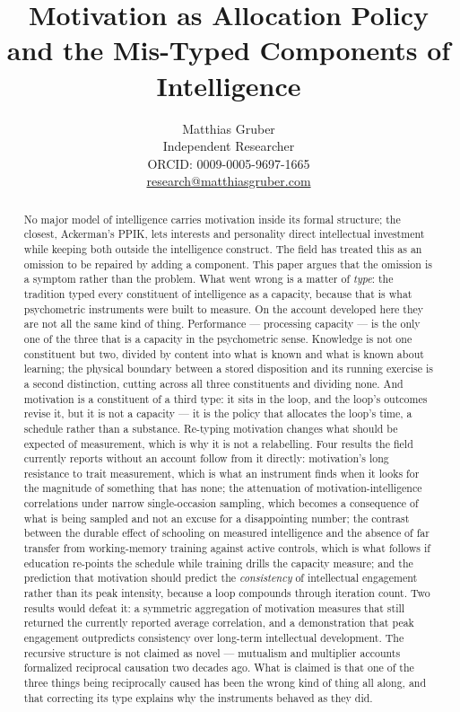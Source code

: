 \documentclass[12pt,a4paper]{article}
\title{Motivation as Allocation Policy and the Mis-Typed Components of Intelligence}
\author{Matthias Gruber\\
\small Independent Researcher\\
\small ORCID: 0009-0005-9697-1665\\
\small \href{mailto:research@matthiasgruber.com}{research@matthiasgruber.com}}
\date{}
\begin{document}
\maketitle

\begin{abstract}

No major model of intelligence carries motivation inside its formal structure; the closest, Ackerman's PPIK, lets interests and personality direct intellectual investment while keeping both outside the intelligence construct. The field has treated this as an omission to be repaired by adding a component. This paper argues that the omission is a symptom rather than the problem. What went wrong is a matter of \emph{type}: the tradition typed every constituent of intelligence as a capacity, because that is what psychometric instruments were built to measure. On the account developed here they are not all the same kind of thing. Performance ---\hspace{0pt} processing capacity ---\hspace{0pt} is the only one of the three that is a capacity in the psychometric sense. Knowledge is not one constituent but two, divided by content into what is known and what is known about learning; the physical boundary between a stored disposition and its running exercise is a second distinction, cutting across all three constituents and dividing none. And motivation is a constituent of a third type: it sits in the loop, and the loop's outcomes revise it, but it is not a capacity ---\hspace{0pt} it is the policy that allocates the loop's time, a schedule rather than a substance. Re-typing motivation changes what should be expected of measurement, which is why it is not a relabelling. Four results the field currently reports without an account follow from it directly: motivation's long resistance to trait measurement, which is what an instrument finds when it looks for the magnitude of something that has none; the attenuation of motivation-intelligence correlations under narrow single-occasion sampling, which becomes a consequence of what is being sampled and not an excuse for a disappointing number; the contrast between the durable effect of schooling on measured intelligence and the absence of far transfer from working-memory training against active controls, which is what follows if education re-points the schedule while training drills the capacity measure; and the prediction that motivation should predict the \emph{consistency} of intellectual engagement rather than its peak intensity, because a loop compounds through iteration count. Two results would defeat it: a symmetric aggregation of motivation measures that still returned the currently reported average correlation, and a demonstration that peak engagement outpredicts consistency over long-term intellectual development. The recursive structure is not claimed as novel ---\hspace{0pt} mutualism and multiplier accounts formalized reciprocal causation two decades ago. What is claimed is that one of the three things being reciprocally caused has been the wrong kind of thing all along, and that correcting its type explains why the instruments behaved as they did.


\end{abstract}
\end{document}
